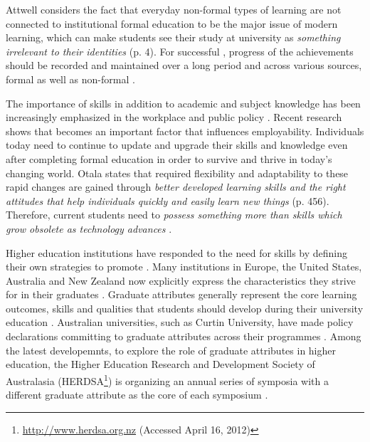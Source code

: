Attwell \citeyearpar{Attwell2007} considers the fact that everyday non-formal
types of learning are not connected to institutional formal education to be the
major issue of modern learning, which can make students see their study at
university as \textit{something irrelevant to their identities} (p. 4). For
successful \LLLsn, progress of the achievements should be recorded and
maintained over a long period and across various sources, formal as well as
non-formal \citep{Kay2008}.


The importance of \LLLs skills in addition to academic and subject knowledge has
been increasingly emphasized in the workplace and public policy
\citep{Morgan-Klein2007,Sutherland2006}. Recent research
\citep{Simmons-McDonald2009} shows that \LLLs becomes an important factor that
influences employability. Individuals today need to continue to update and
upgrade their skills and knowledge even after completing formal education in
order to survive and thrive in today's changing world. Otala
\citeyearpar{Otala1997} states that required flexibility and adaptability to
these rapid changes are gained through \textit{better developed learning skills
and the right attitudes that help individuals quickly and easily learn new
things} (p. 456). Therefore, current students need to \textit{possess something
more than skills which grow obsolete as technology advances}
\cite[p.~195]{Field2003}.

Higher education institutions have responded to the need for \LLLs skills by
defining their own strategies to promote \LLLsn. Many institutions in Europe,
the United States, Australia and New Zealand now explicitly express the \LLLs
characteristics they strive for in their graduates \citep{Scanlon2006}. Graduate
attributes generally represent the core learning outcomes, skills and qualities
that students should develop during their university education
\citep{Hughes2010}. Australian universities, such as Curtin University, have
made policy declarations committing to graduate attributes across their
programmes \citep{CurtinUniversity2006}. Among the latest developemnts, to
explore the role of graduate attributes in higher education, the Higher
Education Research and Development Society of Australasia
(HERDSA\footnote{\url{http://www.herdsa.org.nz} (Accessed April 16, 2012)}) is
organizing an annual series of symposia with a different graduate attribute as the core of each symposium
\citep{HERDSA2012}.

